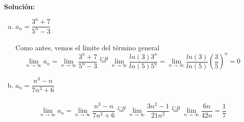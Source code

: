 \documentclass[12pt]{article}
\newenvironment{solucion}
{\begin{mdframed}[backgroundcolor=black!10]
		{\bf Solución:}\\
	}
	{
	\end{mdframed}
}
\newenvironment{preguntas}
{\begin{enumerate}\itemsep12pt
	}
	{
	\end{enumerate}
}
\newcommand{\ra}{\rightarrow}
\begin{document}
\begin{preguntas}
\begin{solucion}
\begin{enumerate}[a)]
\item $a_n = \dfrac{3^n+7}{5^n-3}$\\
			\\
			Como antes, vemos el límite del término general
			$$\lim\limits_{n\ra \infty} a_n = \lim\limits_{n\ra \infty} \dfrac{3^n+7}{5^n-3} \stackrel{L'H}{=} \lim\limits_{n\ra \infty} \dfrac{ln(3)3^n}{ln(5)5^n} = \lim\limits_{n\ra \infty} \dfrac{ln(3)}{ln(5)} \left(\dfrac{3}{5}\right)^n = 0$$
\item $a_n = \dfrac{n^3-n}{7n^3+6}$\\
			\\
			$$\lim\limits_{n\ra \infty} a_n = \lim\limits_{n\ra \infty} \dfrac{n^3-n}{7n^3+6} \stackrel{L'H}{=} \lim\limits_{n\ra \infty} \dfrac{3n^2-1}{21n^2}
			\stackrel{L'H}{=} \lim\limits_{n\ra \infty} \dfrac{6n}{42n} = \dfrac{1}{7}$$
\end{enumerate}
\end{solucion}
\end{preguntas}
\end{document}
